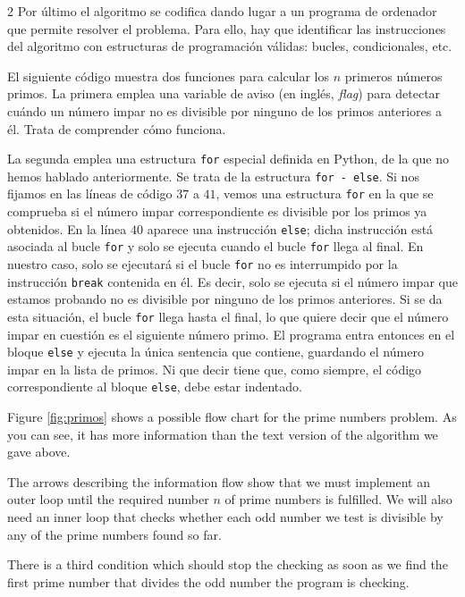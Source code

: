 \begin{paracol}{2}
Por último el algoritmo se codifica dando lugar a un programa de ordenador que permite resolver el problema. Para ello, hay que identificar las instrucciones del algoritmo con estructuras de programación válidas: bucles, condicionales, etc.

El siguiente código muestra dos funciones para calcular los $n$ primeros números primos. La primera emplea una variable de aviso (en inglés, \emph{flag}) para detectar cuándo un número impar no es divisible por ninguno de los primos anteriores a él. Trata de comprender cómo funciona.

La segunda emplea una estructura \texttt{for} especial definida en Python, de la que no hemos hablado anteriormente. Se trata de la estructura \texttt{for - else}.
Si nos fijamos en las líneas de código $37$ a $41$, vemos una estructura \texttt{for} en la que se comprueba si el número impar correspondiente es divisible por los primos ya obtenidos. En la línea $40$ aparece una instrucción \texttt{else}; dicha instrucción está asociada al bucle \texttt{for} y solo se ejecuta cuando el bucle \texttt{for} llega al final. En nuestro caso, solo se ejecutará si el bucle \texttt{for} no es interrumpido por la instrucción \texttt{break} contenida en él. Es decir, solo se ejecuta si el número impar que estamos probando no es divisible por ninguno de los primos anteriores. Si se da esta situación, el bucle \texttt{for} llega hasta el final, lo que quiere decir que el número impar en cuestión es el siguiente número primo. El programa entra entonces en el bloque \texttt{else} y ejecuta la única sentencia que contiene, guardando el número impar en la lista de primos. Ni que decir tiene que, como siempre, el código correspondiente al bloque \texttt{else}, debe estar indentado. 

\switchcolumn
Figure \ref{fig:primos} shows a possible flow chart for the prime numbers problem. As you can see, it has more information than the text version of the algorithm we gave above.

The arrows describing the information flow show that we must implement an outer loop until the required number $n$ of prime numbers is fulfilled. We will also need an inner loop that checks whether each odd number we test is divisible by any of the prime numbers found so far.

There is a third condition which should stop the checking as soon as we find the first prime number that divides the odd number the program is checking.


\end{paracol}
